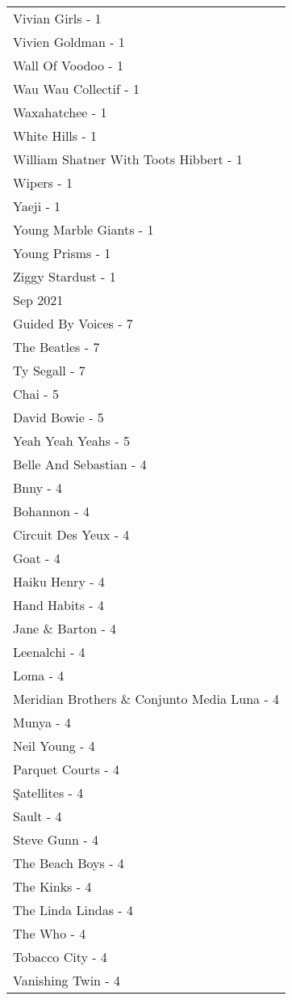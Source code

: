 \documentclass[
]{article}
\begin{document}
\begin{longtable}{l}
Vivian Girls - 1 \\ 
Vivien Goldman - 1 \\ 
Wall Of Voodoo - 1 \\ 
Wau Wau Collectif - 1 \\ 
Waxahatchee - 1 \\ 
White Hills - 1 \\ 
William Shatner With Toots Hibbert - 1 \\ 
Wipers - 1 \\ 
Yaeji - 1 \\ 
Young Marble Giants - 1 \\ 
Young Prisms - 1 \\ 
Ziggy Stardust - 1 \\ 
\midrule
\multicolumn{1}{l}{Sep 2021} \\ 
\midrule
Guided By Voices - 7 \\ 
The Beatles - 7 \\ 
Ty Segall - 7 \\ 
Chai - 5 \\ 
David Bowie - 5 \\ 
Yeah Yeah Yeahs - 5 \\ 
Belle And Sebastian - 4 \\ 
Bnny - 4 \\ 
Bohannon - 4 \\ 
Circuit Des Yeux - 4 \\ 
Goat - 4 \\ 
Haiku Henry - 4 \\ 
Hand Habits - 4 \\ 
Jane \& Barton - 4 \\ 
Leenalchi - 4 \\ 
Loma - 4 \\ 
Meridian Brothers \& Conjunto Media Luna - 4 \\ 
Munya - 4 \\ 
Neil Young - 4 \\ 
Parquet Courts - 4 \\ 
Şatellites - 4 \\ 
Sault - 4 \\ 
Steve Gunn - 4 \\ 
The Beach Boys - 4 \\ 
The Kinks - 4 \\ 
The Linda Lindas - 4 \\ 
The Who - 4 \\ 
Tobacco City - 4 \\ 
Vanishing Twin - 4 \\ 

\end{longtable}
\end{document}
